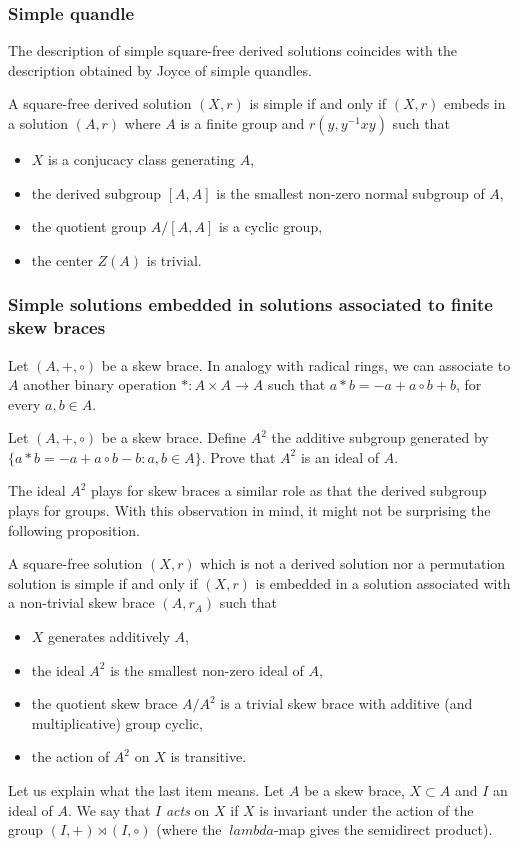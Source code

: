 \subsubsection{Simple quandle}

The description of simple square-free derived solutions coincides with the description obtained by Joyce of simple quandles. 

\begin{proposition}
    A square-free derived solution $(X,r)$ is simple if and only if $(X,r)$ embeds in a solution $(A,r)$ where $A$ is a finite group and $r(y, y^{-1}xy)$ such that
    \begin{itemize}
        \item $X$ is a conjucacy class generating $A$,
        \item the derived subgroup $[A,A]$ is the smallest non-zero normal subgroup of $A$,
        \item the quotient group $A/[A,A]$ is a cyclic group,
        \item the center $Z(A)$ is trivial.
    \end{itemize}
\end{proposition}

\subsubsection{Simple solutions embedded in solutions associated to finite skew braces}

Let $(A,+,\circ)$ be a skew brace. In analogy with radical rings, we can associate to $A$ another binary operation $\ast:A\times A\to A$ such that $a\ast b = -a+a\circ b +b$, for every $a,b\in A$.

\begin{exercise}\label{ex:A2}
    Let $(A,+,\circ)$ be a skew brace. Define $A^2$ the additive subgroup generated by $\{a\ast b=-a+a\circ b - b \colon a,b\in A\}$. Prove that 
    $A^2$ is an ideal of $A$.
\end{exercise}

The ideal $A^2$ plays for skew braces a similar role as that the derived subgroup plays for groups. With this observation in mind, it might not be surprising the following proposition. 

\begin{proposition}
    A square-free solution $(X,r)$ which is not a derived solution nor a permutation solution is simple if and only if $(X,r)$ is embedded in a solution associated with a non-trivial skew brace $(A,r_A)$ such that
    \begin{itemize}
        \item $X$ generates additively $A$,
        \item the ideal $A^2$ is the smallest non-zero ideal of $A$,
        \item the quotient skew brace $A/A^2$ is a trivial skew brace with additive (and multiplicative) group cyclic,
        \item the action of $A^2$ on $X$ is transitive.
    \end{itemize}
\end{proposition}

Let us explain what the last item means. Let $A$ be a skew brace, $X\subset A$ and $I$ an ideal of $A$. We say that $I$ \emph{acts} on $X$ if $X$ is invariant under the action of the group $(I,+)\rtimes (I,\circ)$ (where the $\ lambda$-map gives the semidirect product).